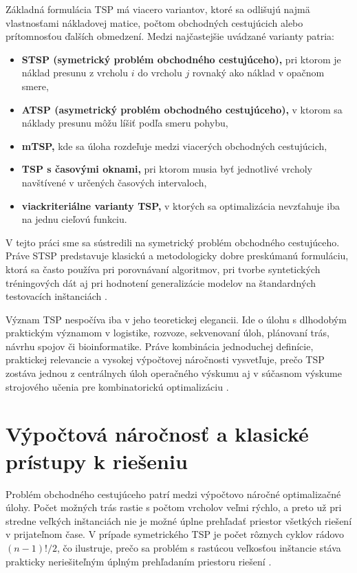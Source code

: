 Základná formulácia TSP má viacero variantov, ktoré sa odlišujú najmä
vlastnosťami nákladovej matice, počtom obchodných cestujúcich alebo prítomnosťou
ďalších obmedzení. Medzi najčastejšie uvádzané varianty patria:

\begin{itemize}[leftmargin=1.5cm,itemsep=3pt,topsep=4pt]
    \item \textbf{STSP (symetrický problém obchodného cestujúceho),}
          pri ktorom je náklad presunu z vrcholu $i$ do vrcholu $j$
          rovnaký ako náklad v opačnom smere,
    \item \textbf{ATSP (asymetrický problém obchodného cestujúceho),}
          v ktorom sa náklady presunu môžu líšiť podľa smeru pohybu,
    \item \textbf{mTSP,} kde sa úloha rozdeľuje medzi viacerých obchodných
          cestujúcich,
    \item \textbf{TSP s časovými oknami,} pri ktorom musia byť jednotlivé
          vrcholy navštívené v určených časových intervaloch,
    \item \textbf{viackriteriálne varianty TSP,} v ktorých sa optimalizácia
          nevzťahuje iba na jednu cieľovú funkciu.
\end{itemize}

V tejto práci sme sa sústredili na symetrický problém obchodného cestujúceho.
Práve STSP predstavuje klasickú a metodologicky dobre preskúmanú formuláciu,
ktorá sa často používa pri porovnávaní algoritmov, pri tvorbe syntetických
tréningových dát aj pri hodnotení generalizácie modelov na štandardných
testovacích inštanciách
\parencite{matai2010overview,reinelt1991tsplib,joshi2022generalization}.

Význam TSP nespočíva iba v jeho teoretickej elegancii. Ide o úlohu
s dlhodobým praktickým významom v logistike, rozvoze, sekvenovaní úloh,
plánovaní trás, návrhu spojov či bioinformatike. Práve kombinácia jednoduchej
definície, praktickej relevancie a vysokej výpočtovej náročnosti vysvetľuje,
prečo TSP zostáva jednou z centrálnych úloh operačného výskumu aj v súčasnom
výskume strojového učenia pre kombinatorickú optimalizáciu
\parencite{matai2010overview,bengio2021mlco}.

\section{Výpočtová náročnosť a klasické prístupy k riešeniu}

Problém obchodného cestujúceho patrí medzi výpočtovo náročné optimalizačné
úlohy. Počet možných trás rastie s počtom vrcholov veľmi rýchlo, a preto už
pri stredne veľkých inštanciách nie je možné úplne prehľadať priestor všetkých
riešení v prijateľnom čase. V prípade symetrického TSP je počet rôznych cyklov
rádovo $(n-1)!/2$, čo ilustruje, prečo sa problém s rastúcou veľkosťou inštancie
stáva prakticky neriešiteľným úplným prehľadaním priestoru riešení
\parencite{matai2010overview}.

